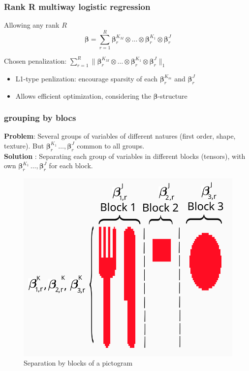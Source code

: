 \documentclass{beamer}
\begin{document}
\begin{frame}
\end{frame}

\begin{frame}
    \frametitle{Rank R multiway logistic regression}
    Allowing any rank $R$ \cite{multi_rank_r}
    $$\bm{\beta} = \sum\limits_{r = 1}^R \bm{\beta}_r^{K_M} \otimes \hdots \otimes \bm{\beta}_r^{K_1} \otimes  \bm{\beta}_r^{J}$$

    Chosen penalization: $\sum\limits_{r = 1}^R \lVert \bm{\beta}_r^{K_M} \otimes \hdots \otimes \bm{\beta}_r^{K_1} \otimes  \bm{\beta}_r^{J} \rVert_1$
    \begin{itemize}
        \item L1-type penlization: encourage sparsity of each $\bm{\beta}_r^{K_m}$ and $\bm{\beta}_r^J$\\[10 pt]
        \item Allows efficient optimization, considering the $\bm{\beta}$-structure
    \end{itemize}
\end{frame}

\begin{frame}
 \frametitle{grouping by blocs}

 \textbf{Problem}: Several groups of variables of different natures (first order, shape, texture). But $\bm{\beta}_r^{K_1} \, \hdots, \bm{\beta}_r^J$ common to all groups. \\[15 pt]

 \textbf{Solution} : Separating each group of variables in different blocks (tensors), with own $\bm{\beta}_r^{K_1} \, \hdots, \bm{\beta}_r^J$ for each block.

 \begin{figure}
        \centering
        \includegraphics[scale = 0.165]{images/picto_explic.png}
        \caption{Separation by blocks of a pictogram}
  \end{figure}

\end{frame}
\end{document}
